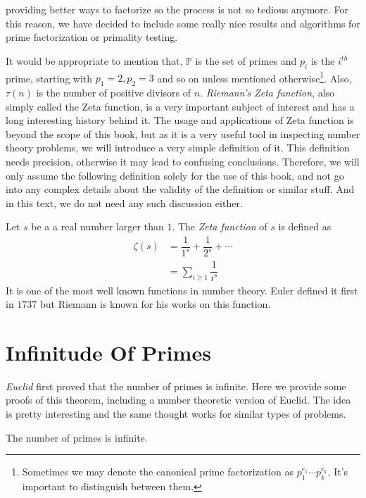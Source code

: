 providing better ways to factorize so the process is not so tedious anymore. For this reason, we have decided to include some really nice results and algorithms for prime factorization or primality testing.

It would be appropriate to mention that, $\mathbb{P}$ is the set of primes and $p_i$ is the $i^{th}$ prime, starting with $p_1=2,p_2=3$ and so on unless mentioned otherwise\footnote{Sometimes we may denote the canonical prime factorization as $p_1^{e_1}\cdots p_k^{e_k}$. It's important to distinguish between them.}. Also, $\tau(n)$ is the number of positive divisors of $n$. \textit{Riemann's Zeta function}, also simply called the Zeta function, is a very important subject of interest and has a long interesting history behind it. The usage and applications of Zeta function is beyond the scope of this book, but as it is a very useful tool in inspecting number theory problems, we will introduce a very simple definition of it. This definition needs precision, otherwise it may lead to confusing conclusions. Therefore, we will only assume the following definition solely for the use of this book, and not go into any complex details about the validity of the definition or similar stuff. And in this text, we do not need any such discussion either.
	\begin{definition}
		Let $s$ be a a real number larger than $1$. The \textit{Zeta function} of $s$ is defined as
			\begin{align*}
				\zeta(s)
					& =\dfrac{1}{1^s}+\dfrac{1}{2^s}+\cdots\\
					& =\sum_{i\geq1}\dfrac{1}{i^s}
			\end{align*}
		It is one of the most well known functions in number theory. Euler defined it first in $1737$ but Riemann is known for his works on this function.
	\end{definition}
\section{Infinitude Of Primes}
\label{sec:infiniteprimes}
\textit{Euclid} first proved that the number of primes is infinite. Here we provide some proofs of this theorem, including a number theoretic version of Euclid. The idea is pretty interesting and the same thought works for similar types of problems.
	\begin{theorem}
		The number of primes is infinite.
	\end{theorem}

